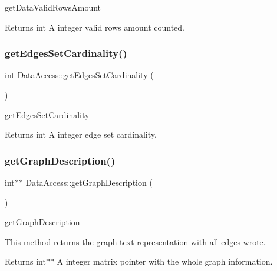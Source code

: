 get\+Data\+Valid\+Rows\+Amount 

\begin{DoxyReturn}{Returns}
int A integer valid rows amount counted. 
\end{DoxyReturn}
\mbox{\label{classDataAccess_a4a7294fd145e7b5f35fe2c94650e1a33}} 
\subsubsection{\texorpdfstring{get\+Edges\+Set\+Cardinality()}{getEdgesSetCardinality()}}
{\footnotesize\ttfamily int Data\+Access\+::get\+Edges\+Set\+Cardinality (\begin{DoxyParamCaption}{ }\end{DoxyParamCaption})}



get\+Edges\+Set\+Cardinality 

\begin{DoxyReturn}{Returns}
int A integer edge set cardinality. 
\end{DoxyReturn}
\mbox{\label{classDataAccess_a94d6b0617c74a6f8f2c66f05caa0a7f0}} 
\subsubsection{\texorpdfstring{get\+Graph\+Description()}{getGraphDescription()}}
{\footnotesize\ttfamily int$\ast$$\ast$ Data\+Access\+::get\+Graph\+Description (\begin{DoxyParamCaption}{ }\end{DoxyParamCaption})}



get\+Graph\+Description 

This method returns the graph text representation with all edges wrote.

\begin{DoxyReturn}{Returns}
int$\ast$$\ast$ A integer matrix pointer with the whole graph information. 
\end{DoxyReturn}
\mbox{\label{classDataAccess_a9dc2cc788a35c1c681df392ab83c01d1}} 

